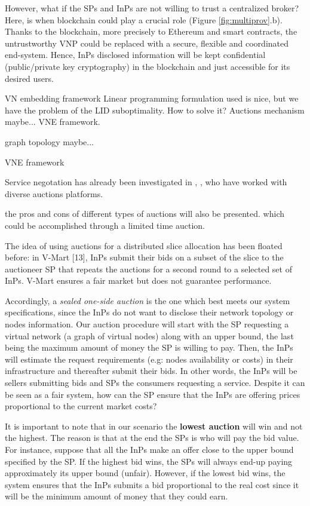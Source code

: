 However, what if the SPs and InPs are not willing to trust a centralized broker? Here, is when blockchain could play a crucial role (Figure \ref{fig:multiprov}.b). Thanks to the blockchain, more precisely to Ethereum and smart contracts, the untrustworthy VNP could be replaced with a secure, flexible and coordinated end-system. Hence, InPs disclosed information will be kept confidential (public/private key cryptography) in the blockchain and just accessible for its desired users. 

VN embedding framework
Linear programming formulation used is nice, but we have the problem of the LID suboptimality. How to solve it? Auctions mechanism maybe... VNE framework.

\citep{dietrich2017multi} graph topology maybe...

\citep{zaheer2010multi} VNE framework

Service negotation has already been investigated in \citep{hausheer2005peermart}, \cite{ogston2002peer}, who have worked with diverse auctions platforms.

the pros and cons of different types of auctions will also be presented.
which could be accomplished through a limited time auction.

The idea of using auctions for a distributed slice allocation has been
floated before: in V-Mart [13], InPs submit their bids on
a subset of the slice to the auctioneer SP that repeats the
auctions for a second round to a selected set of InPs. V-Mart
ensures a fair market but does not guarantee performance.

Accordingly, a \textit{sealed one-side auction} is the one which best meets our system specifications, since the InPs do not want to disclose their network topology or nodes information. Our auction procedure will start with the SP requesting a virtual network (a graph of virtual nodes) along with an upper bound, the last being the maximum amount of money the SP is willing to pay. Then, the InPs will estimate the request requirements (e.g: nodes availability or costs) in their infrastructure and thereafter submit their bids. In other words, the InPs will be sellers submitting bids and SPs the consumers requesting a service. Despite it can be seen as a fair system, how can the SP ensure that the InPs are offering prices proportional to the current market costs?

It is important to note that in our scenario the \textbf{lowest auction} will win and not the highest. The reason is that at the end the SPs is who will pay the bid value. For instance, suppose that all the InPs make an offer close to the upper bound specified by the SP. If the highest bid wins, the SPs will always end-up paying approximately its upper bound (unfair). However, if the lowest bid wins, the system ensures that the InPs submits a bid proportional to the real cost since it will be the minimum amount of money that they could earn.

